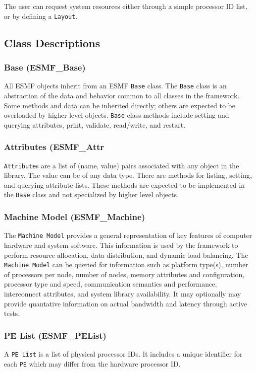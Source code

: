 The user can request system resources either through a simple processor
ID list, or by defining a {\tt Layout}.

\subsection{Class Descriptions}

\subsubsection{Base (ESMF\_Base)}
\label{sec:Base} 
All ESMF objects inherit from an ESMF {\tt Base} class.  
The {\tt Base} class is an abstraction of the data and behavior common to all
classes in the framework.  Some methods and data can be
inherited directly; others are expected to be overloaded by
higher level objects.  {\tt Base} class methods include setting and querying 
attributes, print, validate, read/write, and restart. 

\subsubsection{Attributes (ESMF\_Attr}
\label{sec:Attr}
{\tt Attribute}s are a list of (name, value) pairs associated with any 
object in the library. The value can be of any data type. 
There are methods for listing, setting, and querying attribute lists.
These methods are expected to be implemented in the {\tt Base} class
and not specialized by higher level objects.

\subsubsection{Machine Model (ESMF\_Machine)} 
\label{sec:machine} 
The {\tt Machine Model} provides a general representation of 
key features of computer hardware and system software.  
This information is used by the framework to 
perform resource allocation, data distribution, and dynamic load balancing.  
The {\tt Machine Model} can be queried for information such as
platform type(s), number of processors per node, number of nodes, 
memory attributes and configuration, processor type and speed,
communication semantics and performance, 
interconnect attributes, and system library availability.
It may optionally may provide quantative information 
on actual bandwidth and latency through active tests.  

\subsubsection{PE List (ESMF\_PEList)}
\label{sec:pelist} 
A {\tt PE List} is a list of physical processor IDs.  It includes a 
unique identifier for each {\tt PE} which may differ from the hardware 
processor ID.  

